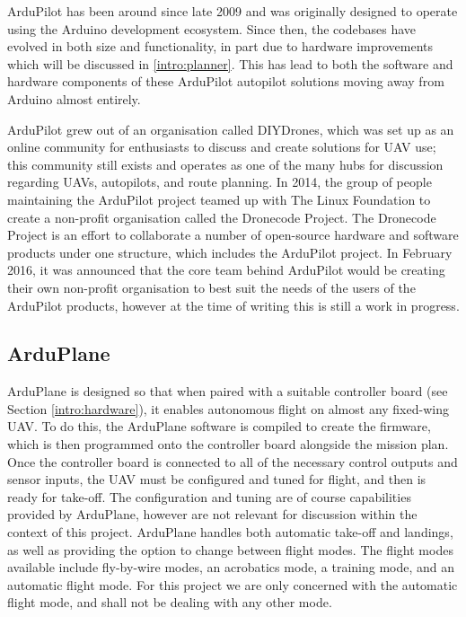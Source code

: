 ArduPilot has been around since late 2009 and was originally designed to operate using the Arduino development ecosystem. Since then, the codebases have evolved in both size and functionality, in part due to hardware improvements which will be discussed in \ref{intro:planner}. This has lead to both the software and hardware components of these ArduPilot autopilot solutions moving away from Arduino almost entirely.

ArduPilot grew out of an organisation called DIYDrones, %
which was set up as an online community for enthusiasts to discuss and create solutions for UAV use; this community still exists and operates as one of the many hubs for discussion regarding UAVs, autopilots, and route planning. In 2014, the group of people maintaining the ArduPilot project teamed up with The Linux Foundation to create a non-profit organisation called the Dronecode Project. The Dronecode Project is an effort to collaborate a number of open-source hardware and software products under one structure, which includes the ArduPilot project. In February 2016, it was announced that the core team behind ArduPilot would be creating their own non-profit organisation to best suit the needs of the users of the ArduPilot products, however at the time of writing this is still a work in progress. %

\subsection{ArduPlane}
\label{intro:arduplane}

ArduPlane is designed so that when paired with a suitable controller board (see Section \ref{intro:hardware}), it enables autonomous flight on almost any fixed-wing UAV. %
To do this, the ArduPlane software is compiled to create the firmware, which is then programmed onto the controller board alongside the mission plan. Once the controller board is connected to all of the necessary control outputs and sensor inputs, the UAV must be configured and tuned for flight, and then is ready for take-off. The configuration and tuning are of course capabilities provided by ArduPlane, however are not relevant for discussion within the context of this project. ArduPlane handles both automatic take-off and landings, as well as providing the option to change between flight modes. The flight modes available include fly-by-wire modes, an acrobatics mode, a training mode, and an automatic flight mode. For this project we are only concerned with the automatic flight mode, and shall not be dealing with any other mode. 

